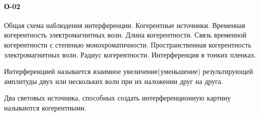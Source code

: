 


\paragraph{О-02}
Общая схема наблюдения интерференции. Когерентные источники. Временная когерентность электромагнитных волн. Длина когерентности. Связь временной когерентности с степенью монохроматичности. Пространственная когерентность электромагнитных волн. Радиус когерентности. Интерференция в тонких пленках.\\

\begin{definition}
Интерференцией называется взаимное увеличение(уменьшение) результирующей амплитуды двух или нескольких волн при их наложении друг на друга.
\end{definition}

\begin{definition}
Два световых источника, способных создать интерференционную картину называются когерентными.
\end{definition}


